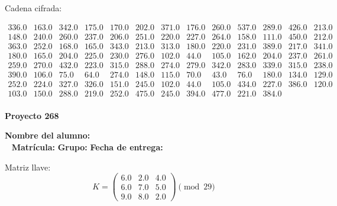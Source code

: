 \documentclass[12pt]{article}
\begin{document}
Cadena cifrada:
\begin{center}
$\begin{array}{lllllllllllll}
336.0 & 163.0 & 342.0 & 175.0 & 170.0 & 202.0 & 371.0 & 176.0 & 260.0 & 537.0 & 289.0 & 426.0 & 213.0\\
148.0 & 240.0 & 260.0 & 237.0 & 206.0 & 251.0 & 220.0 & 227.0 & 264.0 & 158.0 & 111.0 & 450.0 & 212.0\\
363.0 & 252.0 & 168.0 & 165.0 & 343.0 & 213.0 & 313.0 & 180.0 & 220.0 & 231.0 & 389.0 & 217.0 & 341.0\\
180.0 & 165.0 & 204.0 & 225.0 & 230.0 & 276.0 & 102.0 & 44.0 & 105.0 & 162.0 & 204.0 & 237.0 & 261.0\\
259.0 & 270.0 & 432.0 & 223.0 & 315.0 & 288.0 & 274.0 & 279.0 & 342.0 & 283.0 & 339.0 & 315.0 & 238.0\\
390.0 & 106.0 & 75.0 & 64.0 & 274.0 & 148.0 & 115.0 & 70.0 & 43.0 & 76.0 & 180.0 & 134.0 & 129.0\\
252.0 & 224.0 & 327.0 & 326.0 & 151.0 & 245.0 & 102.0 & 44.0 & 105.0 & 434.0 & 227.0 & 386.0 & 120.0\\
103.0 & 150.0 & 288.0 & 219.0 & 252.0 & 475.0 & 245.0 & 394.0 & 477.0 & 221.0 & 384.0\\
\end{array}$
\end{center}

\newpage


\textbf{Proyecto 268}

\textbf{Nombre del alumno:} \underline{\hspace{13cm}}\\\
\vspace{1cm}
\textbf{Matrícula:} \underline{\hspace{4cm}} \hspace{1cm}
\textbf{Grupo:} \underline{\hspace{2cm}}
\textbf{Fecha de entrega:} \underline{\hspace{2cm}}

\medskip

Matriz llave:
\[
K = \begin{pmatrix}
6.0 & 2.0 & 4.0\\
6.0 & 7.0 & 5.0\\
9.0 & 8.0 & 2.0
\end{pmatrix} \pmod{29}
\]
\end{document}
